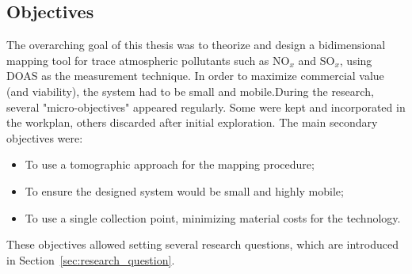 

\subsection{Objectives}%
\label{sub:objectives}

The overarching goal of this thesis was to theorize and design a
bidimensional mapping tool for trace atmospheric pollutants such as
NO$_x$ and SO$_x$, using DOAS as the measurement technique. In order to
maximize commercial value (and viability), the system had to be small
and mobile.During the research, several "micro-objectives" appeared
regularly. Some were kept and incorporated in the workplan, others
discarded after initial exploration. The main secondary objectives were:

\begin{itemize}
    \item To use a tomographic approach for the mapping procedure;
    \item To ensure the designed system would be small and highly
        mobile;
    \item To use a single collection point, minimizing material costs
        for the technology.

\end{itemize}

These objectives allowed setting several research questions, which are
introduced in Section~\ref{sec:research_question}.

